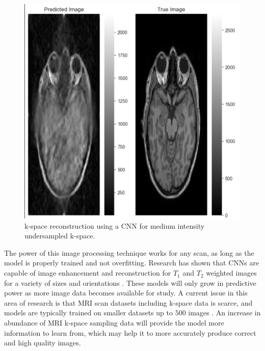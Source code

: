 \documentclass[14pt]{extreport}
\begin{document}
        \begin{figure}[h]
            \centering
            \includegraphics[width=0.5\linewidth]{Image-1.png}
            \caption{k-space reconstruction using a CNN for medium intensity undersampled k-space.}
            \label{img:image-2}
        \end{figure}

        The power of this image processing technique works for any scan, as long as the model is properly trained and not overfitting. Research has shown that CNNs are capable of image enhancement and reconstruction for $T_1$ and $T_2$ weighted images for a variety of sizes and orientations \cite{Wang_Su_Ying_Peng_Zhu_Liang_Feng_Liang_2016}. These models will only grow in predictive power as more image data becomes available for study. A current issue in this area of research is that MRI scan datasets including k-space data is scarce, and models are typically trained on smaller datasets up to $500$ images \cite{Wang_Su_Ying_Peng_Zhu_Liang_Feng_Liang_2016}. An increase in abundance of MRI k-space sampling data will provide the model more information to learn from, which may help it to more accurately produce correct and high quality images.
\end{document}
